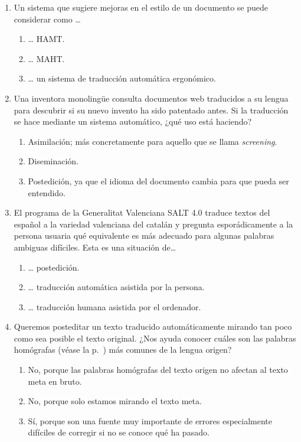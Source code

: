 \begin{enumerate}
\item Un sistema que sugiere mejoras en el estilo de un documento se puede considerar como {\ldots} \begin{enumerate} \item {\ldots} HAMT. \item {\ldots} MAHT. \item {\ldots} un sistema de traducción automática ergonómico. \end{enumerate} 

\item Una inventora monolingüe consulta documentos web traducidos a su lengua para descubrir si su nuevo invento ha sido patentado antes. Si la traducción se hace mediante un sistema automático, ¿qué uso está haciendo? \begin{enumerate} \item Asimilación; más concretamente para aquello que se llama \emph{screening}. \item Diseminación. \item Postedición, ya que el idioma del documento cambia para que pueda ser entendido. \end{enumerate} 

\item El programa de la Generalitat Valenciana SALT 4.0 traduce textos del español a la variedad valenciana del catalán y pregunta esporádicamente a la persona usuaria qué equivalente es más adecuado para algunas palabras ambiguas difíciles. Esta es una situación de{\ldots} \begin{enumerate} \item {\ldots} postedición. \item {\ldots} traducción automática asistida por la persona. \item {\ldots} traducción humana asistida por el ordenador. \end{enumerate} 

\item Queremos posteditar un texto traducido automáticamente mirando tan poco como sea posible el texto original. ¿Nos ayuda conocer cuáles son las palabras homógrafas (véase la p.~\pageref{pg:homografia}) más comunes de la lengua origen? \begin{enumerate} \item No, porque las palabras homógrafas del texto origen no afectan al texto meta en bruto. \item No, porque solo estamos mirando el texto meta. \item Sí, porque son una fuente muy importante de errores especialmente difíciles de corregir si no se conoce qué ha pasado. \end{enumerate} 


\end{enumerate}
